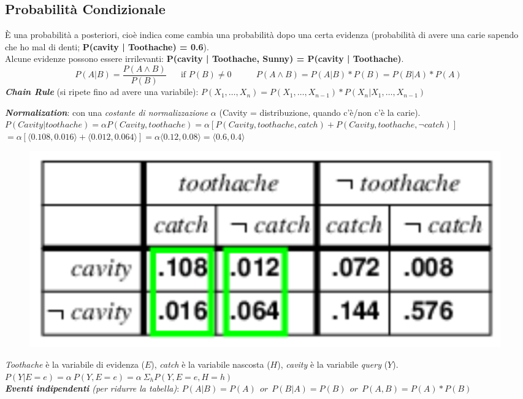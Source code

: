 \documentclass[a4paper, notitlepage, 9pt]{extreport}
\begin{document}
\subsection*{Probabilità Condizionale}
È una probabilità a posteriori, cioè indica come cambia una probabilità dopo una certa evidenza (probabilità di avere una carie sapendo che ho mal di denti; \textbf{P(cavity | Toothache) = 0.6}).\\
Alcune evidenze possono essere irrilevanti: \textbf{P(cavity | Toothache, Sunny) = P(cavity | Toothache)}.
$$ P(A | B) = \frac{P(A \land B)}{P(B)} \text{~~~~~if~} P(B)\neq 0 ~~~~~~~~~~~~~ P(A \land B) = P(A | B) * P(B) = P(B | A) * P(A)$$
\textit{\textbf{Chain Rule}} (si ripete fino ad avere una variabile): $P(X_1, \dots , X_n) = P(X_1, \dots , X_{n-1}) * P(X_n | X_1, \dots , X_{n-1})$
\begin{multicols}{2}
	\noindent
	\textit{\textbf{Normalization}}: con una \textit{costante di normalizzazione} $\alpha$ (Cavity = distribuzione, quando c'è/non c'è la carie).\\
	$P(Cavity|toothache) = \alpha P(Cavity, toothache) = \alpha [P(Cavity, toothache, catch)+P(Cavity, toothache, ¬catch)]$\\
	$= \alpha [\langle 0.108, 0.016\rangle + \langle 0.012, 0.064 \rangle] = \alpha \langle0.12, 0.08 \rangle = \langle 0.6, 0.4\rangle $
	\columnbreak
	\begin{figure}[H]
		\centering
		\includegraphics[scale=0.37]{Joint}
	\end{figure}
\end{multicols}
\noindent
\textit{Toothache} è la variabile di evidenza ($E$), \textit{catch} è la variabile nascosta ($H$), \textit{cavity} è la variabile \textit{query} ($Y$).\\
$P(Y|E=e) = \alpha ~P(Y,E=e) = \alpha ~\Sigma_h P(Y,E=e, H=h)$\\
\textit{\textbf{Eventi indipendenti} (per ridurre la tabella)}: $P(A|B) = P(A) ~~or~~ P(B|A) = P(B) ~~or~~ P(A, B) = P(A) * P(B)$
\end{document}
